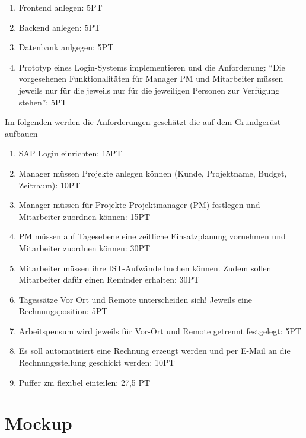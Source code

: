 \documentclass{article}
\begin{document}
    \begin{enumerate}
        \item Frontend anlegen: 5PT
        \item Backend anlegen: 5PT
        \item Datenbank anlgegen: 5PT
        \item Prototyp eines Login-Systems implementieren und die Anforderung: “Die vorgesehenen Funktionalitäten für Manager PM und Mitarbeiter müssen jeweils nur für die jeweils nur für die jeweiligen Personen zur Verfügung stehen”: 5PT
    \end{enumerate}

    Im folgenden werden die Anforderungen geschätzt die auf dem Grundgerüst aufbauen

    \begin{enumerate}
        \item SAP Login einrichten: 15PT
        \item Manager müssen Projekte anlegen können (Kunde, Projektname, Budget, Zeitraum): 10PT
        \item Manager müssen für Projekte Projektmanager (PM) festlegen und Mitarbeiter zuordnen können: 15PT
        \item PM müssen auf Tagesebene eine zeitliche Einsatzplanung vornehmen und Mitarbeiter zuordnen können: 30PT
        \item Mitarbeiter müssen ihre IST-Aufwände buchen können. Zudem sollen Mitarbeiter dafür einen Reminder erhalten: 30PT
        \item Tagessätze Vor Ort und Remote unterscheiden sich! Jeweils eine Rechnungsposition: 5PT
        \item Arbeitspensum wird jeweils für Vor-Ort und Remote getrennt festgelegt: 5PT
        \item Es soll automatisiert eine Rechnung erzeugt werden und per E-Mail an die Rechnungsstellung geschickt werden: 10PT
        \item Puffer zm flexibel einteilen: 27,5 PT


    \end{enumerate}

\newpage

\section{Mockup}
\end{document}
